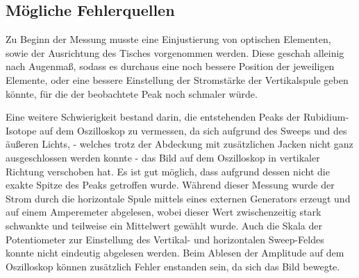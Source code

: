

\subsection{Mögliche Fehlerquellen}

    Zu Beginn der Messung musste eine Einjustierung von optischen Elementen,
    sowie der Ausrichtung des Tisches vorgenommen werden.
    Diese geschah alleinig nach Augenmaß,
    sodass es durchaus eine noch bessere Position der jeweiligen Elemente,
    oder eine bessere Einstellung der Stromstärke der Vertikalspule geben könnte,
    für die der beobachtete Peak noch schmaler würde.

    Eine weitere Schwierigkeit bestand darin,
    die entstehenden Peaks der Rubidium-Isotope auf dem Oszilloskop zu vermessen,
    da sich aufgrund des Sweeps und des äußeren Lichts,
    - welches trotz der Abdeckung mit zusätzlichen Jacken nicht ganz ausgeschlossen werden konnte -
    das Bild auf dem Oszilloskop in vertikaler Richtung verschoben hat.
    Es ist gut möglich,
    dass aufgrund dessen nicht die exakte Spitze des Peaks getroffen wurde.
    Während dieser Messung wurde der Strom durch die horizontale Spule mittels eines externen Generators erzeugt und auf einem Amperemeter abgelesen,
    wobei dieser Wert zwischenzeitig stark schwankte und teilweise ein Mittelwert gewählt wurde.
    Auch die Skala der Potentiometer zur Einstellung des Vertikal- und horizontalen Sweep-Feldes konnte nicht eindeutig abgelesen werden.
    Beim Ablesen der Amplitude auf dem Oszilloskop können zusätzlich Fehler enstanden sein,
    da sich das Bild bewegte.
